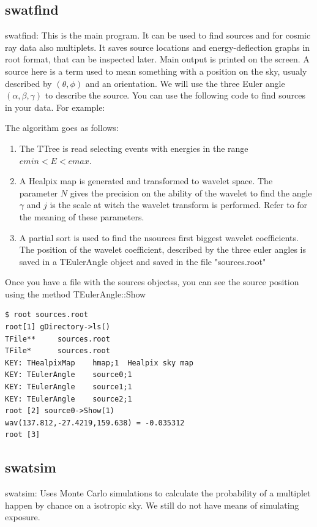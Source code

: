 \documentclass[12pt]{article}
\begin{document}
\subsection{swatfind}
swatfind: This is the main program. It can be used to find sources and for cosmic ray data
also multiplets. It saves source locations and energy-deflection graphs in root format, that can
be inspected later. Main output is printed on the screen.
A source here is a term used to mean something with a position on the sky, usualy described
by $(\theta,\phi)$ and an orientation. We will use the three Euler angle $(\alpha,\beta,\gamma)$ to
describe the source. You can use the following code to find sources in your data.
For example:

The algorithm goes as follows:
\begin{enumerate}
\item The TTree is read selecting events with energies in the range $emin < E < emax$.
\item A Healpix map is generated and transformed to wavelet space. The parameter $N$
gives the precision on the ability of the wavelet to find the angle $\gamma$ and $j$
is the scale at witch the wavelet transform is performed. Refer to \cite{gap} for
the meaning of these parameters.
\item A partial sort is used to find the nsources first biggest wavelet coefficients.
The position of the wavelet coefficient, described by the three euler angles is
saved in a TEulerAngle object and saved in the file {\color{brown}"sources.root"}
\end{enumerate}
Once you have a file with the sources objectss, you can see the source position using
the method {\color{brown}TEulerAngle::Show}
{ \color{brown}
\begin{lstlisting}
$ root sources.root
root[1] gDirectory->ls()
TFile**		sources.root	
TFile*		sources.root	
KEY: THealpixMap	hmap;1	Healpix sky map
KEY: TEulerAngle	source0;1	
KEY: TEulerAngle	source1;1	
KEY: TEulerAngle	source2;1	
root [2] source0->Show(1)
wav(137.812,-27.4219,159.638) = -0.035312
root [3] 
\end{lstlisting}
}

\subsection{swatsim}
swatsim: Uses Monte Carlo simulations to calculate the probability of a multiplet happen by 
chance on a isotropic sky. We still do not have means of simulating exposure.
\end{document}
